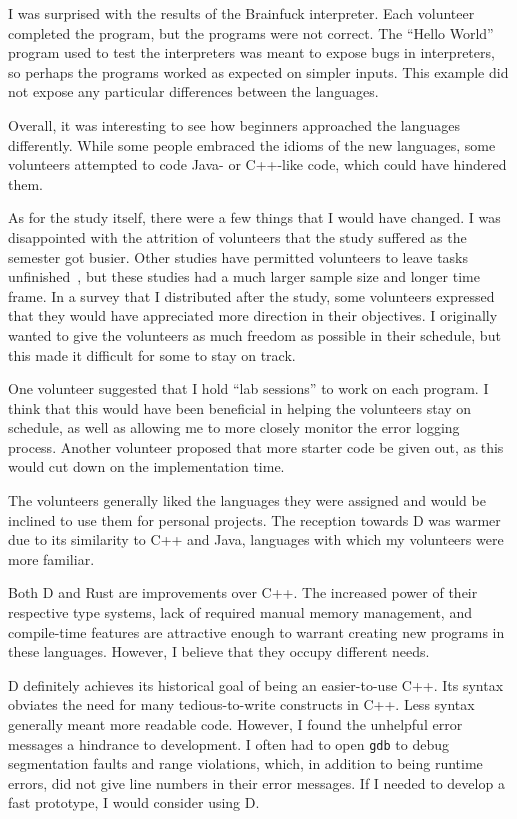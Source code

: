 \documentclass[finalcopy]{srpaper}
\begin{document}
I was surprised with the results of the Brainfuck interpreter. Each volunteer
completed the program, but the programs were not correct. The ``Hello World''
program used to test the interpreters was meant to expose bugs in
interpreters, so perhaps the programs worked as expected on simpler inputs.
This example did not expose any particular differences between the languages.

Overall, it was interesting to see how beginners approached the languages
differently. While some people embraced the idioms of the new languages, some
volunteers attempted to code Java- or C++-like code, which could have hindered
them.

As for the study itself, there were a few things that I would have changed. I
was disappointed with the attrition of volunteers that the study suffered as
the semester got busier. Other studies have permitted volunteers to leave tasks
unfinished~\cite{Hoppe:2013:DBG:2509136.2509528}, but these studies had a much
larger sample size and longer time frame. In a survey that I distributed after
the study, some volunteers expressed that they would have appreciated more
direction in their objectives. I originally wanted to give the volunteers as
much freedom as possible in their schedule, but this made it difficult for some
to stay on track.

One volunteer suggested that I hold ``lab sessions'' to work on each program. I
think that this would have been beneficial in helping the volunteers stay on
schedule, as well as allowing me to more closely monitor the error logging
process. Another volunteer proposed that more starter code be given out, as
this would cut down on the implementation time.

The volunteers generally liked the languages they were assigned and would be
inclined to use them for personal projects. The reception towards D was warmer
due to its similarity to C++ and Java, languages with which my volunteers were
more familiar.

Both D and Rust are improvements over C++. The increased power of their
respective type systems, lack of required manual memory management, and
compile-time features are attractive enough to warrant creating new programs
in these languages. However, I believe that they occupy different needs.

D definitely achieves its historical goal of being an easier-to-use C++. Its
syntax obviates the need for many tedious-to-write constructs in C++. Less
syntax generally meant more readable code. However, I found the unhelpful error
messages a hindrance to development. I often had to open \texttt{gdb} to debug
segmentation faults and range violations, which, in addition to being runtime
errors, did not give line numbers in their error messages. If I needed to
develop a fast prototype, I would consider using D.
\end{document}
